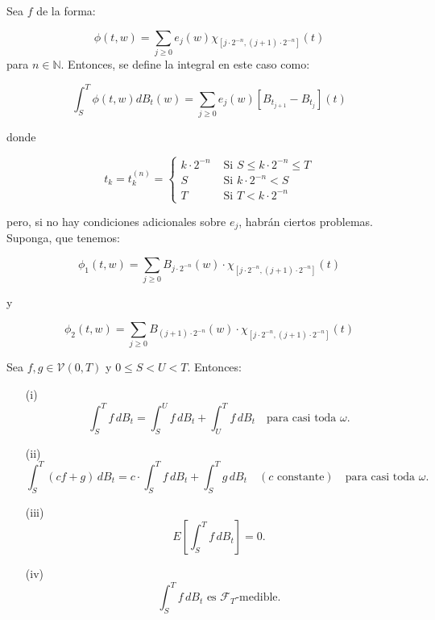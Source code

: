 Sea $f$ de la forma:

\[
	\phi (t, w) = \sum_{j \geq 0} e_j (w) \chi_{ [j \cdot 2^{-n}, (j+1)\cdot 2^{-n}  ] }(t)
\]
para $n \in \mathbb{N}$. Entonces, se define la integral en este caso como:

\[
	\int_S^T \phi(t,w) dB_t(w) = \sum_{j \geq 0} e_j (w) [B_{t_{j+1}} - B_{t_j}] (t)
\]

donde

\[
	t_k = t_k^{(n)} = \left\{  \begin{array}{lr}
		k \cdot 2^{-n} & \text{ Si } S \leq k \cdot 2^{-n} \leq T \\
		S & \text{ Si } k \cdot 2^{-n} < S \\
		T & \text{ Si } T < k \cdot 2^{-n}
	\end{array} \right.
\]

pero, si no hay condiciones adicionales sobre $e_j$, habrán ciertos problemas. Suponga, que tenemos:

\[
	\phi_1(t,w)  = \sum_{j \geq 0} B_{j \cdot 2^{-n} } (w) \cdot \chi_{ [j \cdot 2^{-n}, (j+1) \cdot 2^{-n} ]  } (t)
\]

y

\[
	\phi_2(t,w)  = \sum_{j \geq 0} B_{(j+1) \cdot 2^{-n} } (w) \cdot \chi_{ [j \cdot 2^{-n}, (j+1) \cdot 2^{-n} ]  } (t)
\]



\begin{theorem}[3.2.1]
Sea $ f, g \in \mathcal{V}(0, T) $ y  $ 0 \leq S < U < T $. Entonces:

\begin{enumerate}
    \item[(i)] \[ 
        \int_{S}^{T} f \, dB_t = \int_{S}^{U} f \, dB_t + \int_{U}^{T} f \, dB_t \quad \text{para casi toda } \omega.
    \]
    
    \item[(ii)] \[
        \int_{S}^{T} (c f + g) \, dB_t = c \cdot \int_{S}^{T} f \, dB_t + \int_{S}^{T} g \, dB_t \quad (c \text{ constante}) \quad \text{para casi toda } \omega.
    \]
    
    \item[(iii)] \[
        E \left[ \int_{S}^{T} f \, dB_t \right] = 0.
    \]
    
    \item[(iv)] \[
        \int_{S}^{T} f \, dB_t \text{ es } \mathcal{F}_T\text{-medible}.
    \]
\end{enumerate}
\end{theorem}

